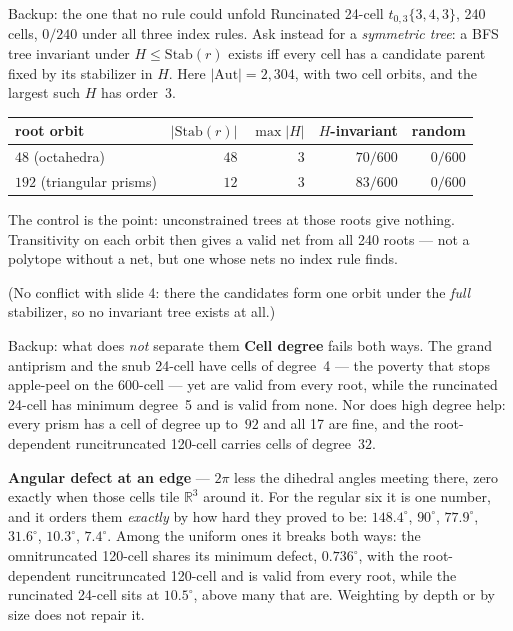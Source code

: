 \documentclass[aspectratio=43,11pt]{beamer}
\newcommand{\RR}{\mathbb{R}}
\begin{document}
\begin{frame}{Backup: the one that no rule could unfold}
  \small
  Runcinated 24-cell $t_{0,3}\{3,4,3\}$, 240 cells, $0/240$ under all
  three index rules. Ask instead for a \emph{symmetric tree}: a BFS
  tree invariant under $H\le\mathrm{Stab}(r)$ exists iff every cell has
  a candidate parent fixed by its stabilizer in $H$. Here
  $|\mathrm{Aut}| = 2{,}304$, with two cell orbits, and the largest
  such $H$ has order~$3$.
  \smallskip

  \centering
  {\footnotesize
  \begin{tabular}{lrrrr}
    \toprule
    root orbit & $|\mathrm{Stab}(r)|$ & $\max|H|$
      & $H$-invariant & random\\
    \midrule
    $48$ (octahedra)          & $48$ & $3$ & $70/600$ & \alert{$0/600$}\\
    $192$ (triangular prisms) & $12$ & $3$ & $83/600$ & \alert{$0/600$}\\
    \bottomrule
  \end{tabular}}

  \raggedright\smallskip
  The control is the point: unconstrained trees at those roots give
  nothing. Transitivity on each orbit then gives a valid net from
  \alert{all 240 roots} --- not a polytope without a net, but one whose
  nets no index rule finds.
  \smallskip

  (No conflict with slide 4: there the candidates form one orbit under
  the \emph{full} stabilizer, so no invariant tree exists at all.)
\end{frame}

\begin{frame}{Backup: what does \emph{not} separate them}
  \small
  \textbf{Cell degree} fails both ways. The grand antiprism and the
  snub 24-cell have cells of degree~4 --- the poverty that stops
  apple-peel on the 600-cell --- yet are valid from every root, while
  the runcinated 24-cell has minimum degree~5 and is valid from none.
  Nor does high degree help: every prism has a cell of degree up
  to~$92$ and all 17 are fine, and the root-dependent runcitruncated
  120-cell carries cells of degree~$32$.
  \medskip

  \textbf{Angular defect at an edge} --- $2\pi$ less the dihedral
  angles meeting there, zero exactly when those cells tile $\RR^3$
  around it. For the regular six it is one number, and it orders them
  \emph{exactly} by how hard they proved to be: $148.4^\circ$,
  $90^\circ$, $77.9^\circ$, $31.6^\circ$, $10.3^\circ$, $7.4^\circ$.
  Among the uniform ones it breaks both ways: the omnitruncated
  120-cell shares its minimum defect, $0.736^\circ$, with the
  root-dependent runcitruncated 120-cell and is valid from every root,
  while the runcinated 24-cell sits at $10.5^\circ$, above many that
  are. Weighting by depth or by size does not repair it.
\end{frame}
\end{document}
